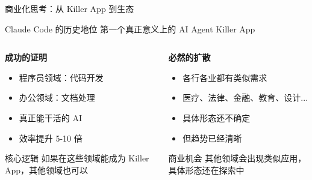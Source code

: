 \documentclass[aspectratio=169,xcolor=dvipsnames]{beamer}
\begin{document}
\begin{frame}{商业化思考：从 Killer App 到生态}
  \begin{block}{Claude Code 的历史地位}
    第一个真正意义上的 AI Agent Killer App
  \end{block}

  \vspace{0.3cm}

  \begin{columns}
    \begin{column}{0.48\textwidth}
      \textbf{成功的证明}
      \begin{itemize}
        \item 程序员领域：代码开发
        \item 办公领域：文档处理
        \item 真正能干活的 AI
        \item 效率提升 5-10 倍
      \end{itemize}

      \vspace{0.3cm}

      \begin{exampleblock}{核心逻辑}
        如果在这些领域能成为 Killer App，其他领域也可以
      \end{exampleblock}
    \end{column}
    \begin{column}{0.48\textwidth}
      \textbf{必然的扩散}
      \begin{itemize}
        \item 各行各业都有类似需求
        \item 医疗、法律、金融、教育、设计...
        \item 具体形态还不确定
        \item 但趋势已经清晰
      \end{itemize}

      \vspace{0.3cm}

      \begin{alertblock}{商业机会}
        其他领域会出现类似应用，具体形态还在探索中
      \end{alertblock}
    \end{column}
  \end{columns}
\end{frame}
\end{document}
